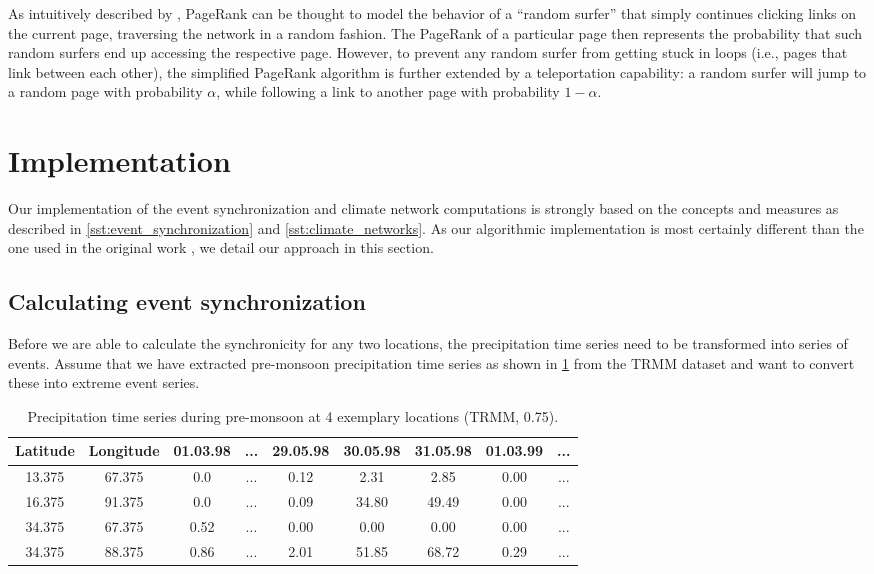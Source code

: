 As intuitively described by \citet{Page.1999}, PageRank can be thought to model the behavior of a ``random surfer'' that simply continues clicking links on the current page, traversing the network in a random fashion. The PageRank of a particular page then represents the probability that such random surfers end up accessing the respective page. However, to prevent any random surfer from getting stuck in loops (i.e., pages that link between each other), the simplified PageRank algorithm is further extended by a teleportation capability: a random surfer will jump to a random page with probability $\alpha$, while following a link to another page with probability $1-\alpha$.


\clearpage
\section{Implementation}
\label{st:event_sync_implementation}
Our implementation of the event synchronization and climate network computations is strongly based on the concepts and measures as described in \cref{sst:event_synchronization} and \cref{sst:climate_networks}. As our algorithmic implementation is most certainly different than the one used in the original work \citep{Stolbova.2015}, we detail our approach in this section.

\subsection{Calculating event synchronization}
\label{sst:event_sync_calculation}
Before we are able to calculate the synchronicity for any two locations, the precipitation time series need to be transformed into series of events. Assume that we have extracted pre-monsoon precipitation time series as shown in \cref{tab:example_rainfall_ts} from the TRMM dataset and want to convert these into extreme event series.

\begin{table}[h]
  \centering
  \begin{tabular}{ cc|ccccccc }
    \toprule
    \textbf{Latitude} & \textbf{Longitude} & \textbf{01.03.98} & \textbf{...} & \textbf{29.05.98} & \textbf{30.05.98} & \textbf{31.05.98} & \textbf{01.03.99} & ...\\
    \midrule
    13.375 & 67.375 & 0.0  & ... & 0.12 & 2.31  & 2.85  & 0.00 & ... \\
    16.375 & 91.375 & 0.0  & ... & 0.09 & 34.80 & 49.49 & 0.00 & ... \\
    34.375 & 67.375 & 0.52 & ... & 0.00 & 0.00  & 0.00  & 0.00 & ... \\
    34.375 & 88.375 & 0.86 & ... & 2.01 & 51.85 & 68.72 & 0.29 & ... \\
    \bottomrule
  \end{tabular}
  \caption{Precipitation time series during pre-monsoon at 4 exemplary locations (TRMM, 0.75\degree).}
  \label{tab:example_rainfall_ts}
\end{table}

